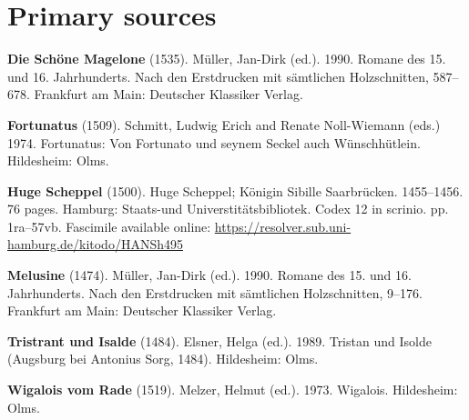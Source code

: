 \documentclass[output=paper,colorlinks,citecolor=brown]{langscibook}
\begin{document}
\section*{Primary sources}
\begin{hangparas}{.25in}{1}
\textbf{Die Schöne Magelone} (1535). Müller, Jan-Dirk (ed.). 1990. Romane des 15. und 16. Jahrhunderts. Nach den Erstdrucken mit sämtlichen Holzschnitten, 587–678. Frankfurt am Main: Deutscher Klassiker Verlag.

\textbf{Fortunatus} (1509). Schmitt, Ludwig Erich and Renate Noll-Wiemann (eds.) 1974. Fortunatus: Von Fortunato und seynem Seckel auch Wünschhütlein. Hildesheim: Olms.

\textbf{Huge Scheppel} (1500). Huge Scheppel; Königin Sibille Saarbrücken. 1455--1456. 76 pages. Hamburg: Staats-und Universtitätsbibliotek. Codex 12 in scrinio. pp. 1ra--57vb. Fascimile available online: \url{https://resolver.sub.uni-hamburg.de/kitodo/HANSh495}

\textbf{Melusine} (1474). Müller, Jan-Dirk (ed.). 1990. Romane des 15. und 16. Jahrhunderts. Nach den Erstdrucken mit sämtlichen Holzschnitten, 9–176. Frankfurt am Main: Deutscher Klassiker Verlag.

\textbf{Tristrant und Isalde} (1484). Elsner, Helga (ed.). 1989. Tristan und Isolde (Augsburg bei Antonius Sorg, 1484). Hildesheim: Olms.

\textbf{Wigalois vom Rade} (1519). Melzer, Helmut (ed.). 1973. Wigalois. Hildesheim: Olms.
\end{hangparas}

\bigskip 

\sloppy
\printbibliography[heading=subbibliography,notkeyword=this]
\end{document}
